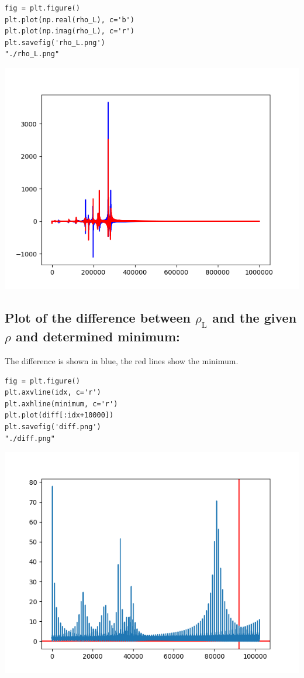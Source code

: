 \documentclass[11pt]{article}
\begin{document}
\begin{verbatim}
fig = plt.figure()
plt.plot(np.real(rho_L), c='b')
plt.plot(np.imag(rho_L), c='r')
plt.savefig('rho_L.png')
"./rho_L.png"
\end{verbatim}

\begin{center}
\includegraphics[width=.9\linewidth]{./rho_L.png}
\end{center}

\subsection{Plot of the difference between \(\rho_{\text{L}}\) and the given \(\rho\) and determined minimum:}
\label{sec:org60f690a}

The difference is shown in blue, the red lines show the minimum.

\begin{verbatim}
fig = plt.figure()
plt.axvline(idx, c='r')
plt.axhline(minimum, c='r')
plt.plot(diff[:idx+10000])
plt.savefig('diff.png')
"./diff.png"
\end{verbatim}

\begin{center}
\includegraphics[width=.9\linewidth]{./diff.png}
\end{center}
\end{document}
